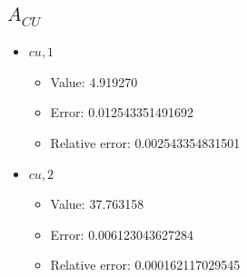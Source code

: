 \documentclass{article}%
\begin{document}
\subsection{$A_{CU}$}%
\begin{itemize}%
	\item $\textit{cu},1$%
	\begin{itemize}%
		\item Value: 4.919270%
		\item Error: 0.012543351491692%
		\item Relative error: 0.002543354831501%
	\end{itemize}%
	\item $\textit{cu},2$%
	\begin{itemize}%
		\item Value: 37.763158%
		\item Error: 0.006123043627284%
		\item Relative error: 0.000162117029545%
	\end{itemize}%
\end{itemize}%
\end{document}
